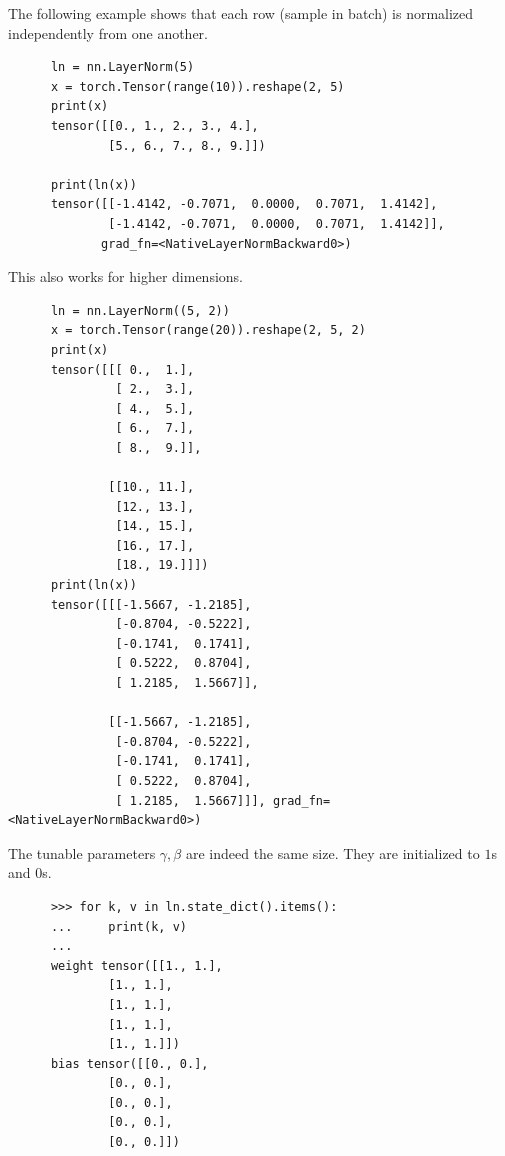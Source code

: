 \documentclass{article}
\begin{document}
  \begin{example}
    The following example shows that each row (sample in batch) is normalized independently from one another. 
    \begin{lstlisting}
      ln = nn.LayerNorm(5)
      x = torch.Tensor(range(10)).reshape(2, 5)
      print(x)
      tensor([[0., 1., 2., 3., 4.],
              [5., 6., 7., 8., 9.]])

      print(ln(x))
      tensor([[-1.4142, -0.7071,  0.0000,  0.7071,  1.4142],
              [-1.4142, -0.7071,  0.0000,  0.7071,  1.4142]],
             grad_fn=<NativeLayerNormBackward0>)
    \end{lstlisting}
    This also works for higher dimensions. 
    \begin{lstlisting}
      ln = nn.LayerNorm((5, 2))
      x = torch.Tensor(range(20)).reshape(2, 5, 2)
      print(x)
      tensor([[[ 0.,  1.],
               [ 2.,  3.],
               [ 4.,  5.],
               [ 6.,  7.],
               [ 8.,  9.]],

              [[10., 11.],
               [12., 13.],
               [14., 15.],
               [16., 17.],
               [18., 19.]]])
      print(ln(x))
      tensor([[[-1.5667, -1.2185],
               [-0.8704, -0.5222],
               [-0.1741,  0.1741],
               [ 0.5222,  0.8704],
               [ 1.2185,  1.5667]],

              [[-1.5667, -1.2185],
               [-0.8704, -0.5222],
               [-0.1741,  0.1741],
               [ 0.5222,  0.8704],
               [ 1.2185,  1.5667]]], grad_fn=<NativeLayerNormBackward0>)
    \end{lstlisting}
    The tunable parameters $\gamma, \beta$ are indeed the same size. They are initialized to $1$s and $0$s. 
      \begin{lstlisting}
      >>> for k, v in ln.state_dict().items(): 
      ...     print(k, v)
      ... 
      weight tensor([[1., 1.],
              [1., 1.],
              [1., 1.],
              [1., 1.],
              [1., 1.]])
      bias tensor([[0., 0.],
              [0., 0.],
              [0., 0.],
              [0., 0.],
              [0., 0.]])
    \end{lstlisting}
  \end{example}
\end{document}
